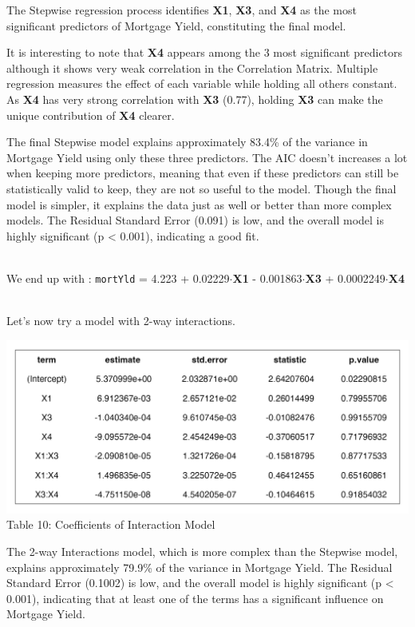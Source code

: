 \documentclass[
  11pt,
]{article}
\begin{document}
The Stepwise regression process identifies \textbf{X1}, \textbf{X3}, and
\textbf{X4} as the most significant predictors of Mortgage Yield,
constituting the final model.

It is interesting to note that \textbf{X4} appears among the 3 most
significant predictors although it shows very weak correlation in the
Correlation Matrix. Multiple regression measures the effect of each
variable while holding all others constant. As \textbf{X4} has very
strong correlation with \textbf{X3} (0.77), holding \textbf{X3} can make
the unique contribution of \textbf{X4} clearer.

The final Stepwise model explains approximately 83.4\% of the variance
in Mortgage Yield using only these three predictors. The AIC doesn't
increases a lot when keeping more predictors, meaning that even if these
predictors can still be statistically valid to keep, they are not so
useful to the model. Though the final model is simpler, it explains the
data just as well or better than more complex models. The Residual
Standard Error (0.091) is low, and the overall model is highly
significant (p \textless{} 0.001), indicating a good fit.\\
\strut \\
We end up with : \texttt{mortYld} = 4.223 + 0.02229\(\cdot\)\textbf{X1}
- 0.001863\(\cdot\)\textbf{X3} + 0.0002249\(\cdot\)\textbf{X4}\\
\strut \\
Let's now try a model with 2-way interactions.

\begin{minipage}{0.4\textwidth}
\includegraphics[width=1.5\linewidth]{interaction_model_coef.png}
\vspace{0.3em}
\small Table 10: Coefficients of Interaction Model
\end{minipage}
\hfill
\begin{minipage}{0.35\textwidth}
\small
The 2-way Interactions model, which is more complex than the Stepwise
model, explains approximately 79.9\% of the variance in Mortgage Yield.
The Residual Standard Error (0.1002) is low, and the overall model is
highly significant (p < 0.001), indicating that at least one of the
terms has a significant influence on Mortgage Yield.
\end{minipage}
\end{document}
